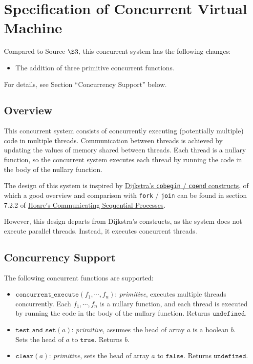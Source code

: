 \documentclass[11pt]{article}
\author{koo}
\date{\today}
\title{}
\begin{document}
\section{Specification of Concurrent Virtual Machine}
\label{sec:orgc6ebafc}
Compared to Source \(\S 3\), this concurrent system has the following changes:
\begin{itemize}
\item The addition of three primitive concurrent functions.
\end{itemize}
For details, see Section ``Concurrency Support'' below.

\subsection{Overview}
\label{sec:orgf0735e6}
This concurrent system consists of concurrently executing (potentially multiple) code in multiple threads. Communication between threads is achieved by updating the values of memory shared between threads. Each thread is a nullary function, so the concurrent system executes each thread by running the code in the body of the nullary function.

The design of this system is inspired by \href{https://doi.org/10.1007/978-1-4757-3472-0\_2}{Dijkstra's \texttt{cobegin} / \texttt{coend} constructs}, of which a good overview and comparison with \texttt{fork} / \texttt{join} can be found in section 7.2.2 of \href{https://doi.org/10.1145/359576.359585}{Hoare's Communicating Sequential Processes}.

However, this design departs from Dijkstra's constructs, as the system does not execute parallel threads. Instead, it executes concurrent threads.

\subsection{Concurrency Support}
\label{sec:orga25444d}
The following concurrent functions are supported:
\begin{itemize}
\item \(\texttt{concurrent\_execute}(f_1, \cdots ,f_n)\): \textit{primitive}, executes multiple threads concurrently. Each \(f_1, \cdots ,f_n\) is a nullary function, and each thread is executed by running the code in the body of the nullary function. Returns \(\texttt{undefined}\).
\item \(\texttt{test\_and\_set}(a)\): \textit{primitive}, assumes the head of array \(a\) is a boolean \(b\). Sets the head of \(a\) to \(\texttt{true}\). Returns \(b\).
\item \(\texttt{clear}(a)\): \textit{primitive}, sets the head of array \(a\) to \(\texttt{false}\). Returns \(\texttt{undefined}\).
\end{itemize}
\end{document}
